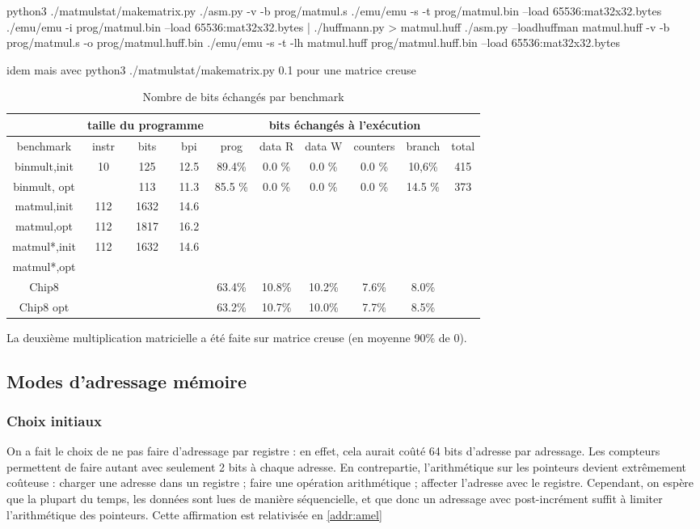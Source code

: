 \documentclass[architecture]{compas2018}
\begin{document}
python3 ./matmulstat/makematrix.py
./asm.py -v -b prog/matmul.s
./emu/emu -s -t prog/matmul.bin --load 65536:mat32x32.bytes
./emu/emu -i prog/matmul.bin --load 65536:mat32x32.bytes | ./huffmann.py > matmul.huff
./asm.py --loadhuffman matmul.huff -v -b prog/matmul.s -o prog/matmul.huff.bin
./emu/emu -s -t -lh matmul.huff prog/matmul.huff.bin --load 65536:mat32x32.bytes

idem mais avec python3 ./matmulstat/makematrix.py 0.1 pour une matrice creuse

\fi


\begin{table}
  \centering
  \begin{tabular}{|c||c|c|c||c|c|c|c|c||c|}
    \hline
    & \multicolumn{3}{c||}{taille du programme} & \multicolumn{6}{c|}{bits échangés à l'exécution}                    \\
    \hline

    
    benchmark    & instr & bits & bpi  & prog    & data R & data W & counters & branch  & total \\
    \hline
    \hline
    binmult,init & 10    & 125  & 12.5 & 89.4\%  & 0.0 \% & 0.0 \% & 0.0 \%   & 10,6\%  & 415   \\
    binmult, opt &       & 113  & 11.3 & 85.5 \% & 0.0 \% & 0.0 \% & 0.0 \%   & 14.5 \% & 373   \\
    \hline
    matmul,init & 112 & 1632 & 14.6  \\ 
    matmul,opt & 112 & 1817 & 16.2 \\
    \hline
    matmul*,init & 112 & 1632 & 14.6 \\
    matmul*,opt & & & \\
    \hline
    Chip8        &       &      &      & 63.4\%  & 10.8\% & 10.2\% & 7.6\%    & 8.0\%   &       \\
    Chip8 opt    &       &      &      & 63.2\%  & 10.7\% & 10.0\% & 7.7\%    & 8.5\%   &       \\ 
    \hline
  \end{tabular}
  \caption{Nombre de bits échangés par benchmark}
  \label{tab:bitcounts}
  La deuxième multiplication matricielle a été faite sur matrice creuse (en moyenne 90\% de 0).
\end{table}


\subsection{Modes d'adressage mémoire}
\subsubsection{Choix initiaux}
On a fait le choix de ne pas faire d'adressage par registre : en effet, cela aurait coûté 64 bits d'adresse par adressage. Les compteurs permettent de faire autant avec seulement 2 bits à chaque adresse. En contrepartie, l'arithmétique sur les pointeurs devient extrêmement coûteuse : charger une adresse dans un registre ; faire une opération arithmétique ; affecter l'adresse avec le registre. Cependant, on espère que la plupart du temps, les données sont lues de manière séquencielle, et que donc un adressage avec post-incrément suffit à limiter l'arithmétique des pointeurs. Cette affirmation est relativisée en \ref{addr:amel}  
\end{document}
